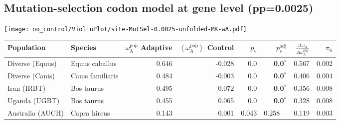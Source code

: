 \subsection{Mutation-selection codon model at gene level (pp=0.0025)}
\begin{center}
\texttt{[image: no\_control/ViolinPlot/site-MutSel-0.0025-unfolded-MK-wA.pdf]}
\begin{adjustbox}{width = 1\textwidth}
\begin{tabular}{|l|l|r|r|r|r|r|r|}
\toprule
                     Population &              Species & \specialcell{$\omega_{\mathrm{A}}^{\mathrm{pop}}$ \\ Adaptive} & \specialcell{$\left< \omega_{\mathrm{A}}^{\mathrm{pop}} \right>$ \\ Control} & $p_{\mathrm{v}}$ & $p_{\mathrm{v}}^{\mathrm{adj}}$ & $\frac{\Delta\omega_{\mathrm{A}}}{\Delta\omega_{\mathrm{A}}^{\mathrm{phy}}}$ & $\pi_{\textrm{S}}$ \\
\midrule
                Diverse (Equus) &       Equus caballus &                                              0.646 &                                             -0.028 &              0.0 &                    \textbf{0.0}$\bm{^*}$ &                                              0.567 &              0.002 \\
                Diverse (Canis) &     Canis familiaris &                                              0.484 &                                             -0.003 &              0.0 &                    \textbf{0.0}$\bm{^*}$ &                                              0.406 &              0.004 \\
                    Iran (IRBT) &           Bos taurus &                                              0.495 &                                              0.072 &              0.0 &                    \textbf{0.0}$\bm{^*}$ &                                              0.356 &              0.008 \\
                  Uganda (UGBT) &           Bos taurus &                                              0.455 &                                              0.065 &              0.0 &                    \textbf{0.0}$\bm{^*}$ &                                              0.328 &              0.008 \\
               Australia (AUCH) &         Capra hircus &                                              0.143 &                                              0.001 &            0.043 &                         0.258~~ &                                              0.119 &              0.003 \\

\end{tabular}
\end{adjustbox}
\end{center}
